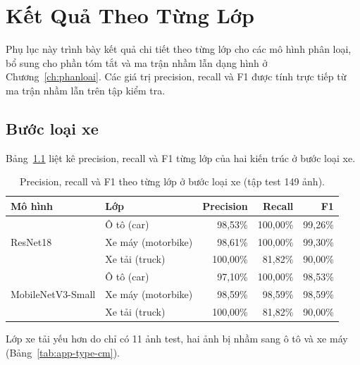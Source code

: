 \chapter{Kết Quả Theo Từng Lớp}
\label{app:ketqualop}

Phụ lục này trình bày kết quả chi tiết theo từng lớp cho các mô hình phân loại, bổ sung cho phần tóm tắt và ma trận nhầm lẫn dạng hình ở Chương~\ref{ch:phanloai}. Các giá trị precision, recall và F1 được tính trực tiếp từ ma trận nhầm lẫn trên tập kiểm tra.

\section{Bước loại xe}

Bảng~\ref{tab:app-type-perclass} liệt kê precision, recall và F1 từng lớp của hai kiến trúc ở bước loại xe.

\begin{table}[htbp]
\centering
\caption{Precision, recall và F1 theo từng lớp ở bước loại xe (tập test 149 ảnh).}
\label{tab:app-type-perclass}

\vspace{4pt}
\begin{tabular}{@{}llrrr@{}}
\toprule
\textbf{Mô hình} & \textbf{Lớp} & \textbf{Precision} & \textbf{Recall} & \textbf{F1} \\
\midrule
\multirow{3}{*}{ResNet18}
 & Ô tô (car)        & 98,53\% & 100,00\% & 99,26\% \\
 & Xe máy (motorbike)& 98,61\% & 100,00\% & 99,30\% \\
 & Xe tải (truck)    & 100,00\% & 81,82\% & 90,00\% \\
\midrule
\multirow{3}{*}{MobileNetV3-Small}
 & Ô tô (car)        & 97,10\% & 100,00\% & 98,53\% \\
 & Xe máy (motorbike)& 98,59\% & 98,59\% & 98,59\% \\
 & Xe tải (truck)    & 100,00\% & 81,82\% & 90,00\% \\
\bottomrule
\end{tabular}
\end{table}

Lớp xe tải yếu hơn do chỉ có 11 ảnh test, hai ảnh bị nhầm sang ô tô và xe máy (Bảng~\ref{tab:app-type-cm}).

